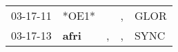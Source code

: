 \begin{supertabular}{p{0.07\textwidth}p{0.06\textwidth}p{0.02\textwidth}p{0.02\textwidth}p{0.06\textwidth}}
 03-17-11\textsuperscript{} &                            *OE1* &    &  , &  GLOR\textsuperscript{} \\
 03-17-13\textsuperscript{} &  \textbf{afri\textsuperscript{}} &  , &  , &  SYNC\textsuperscript{} \\
\end{supertabular}
